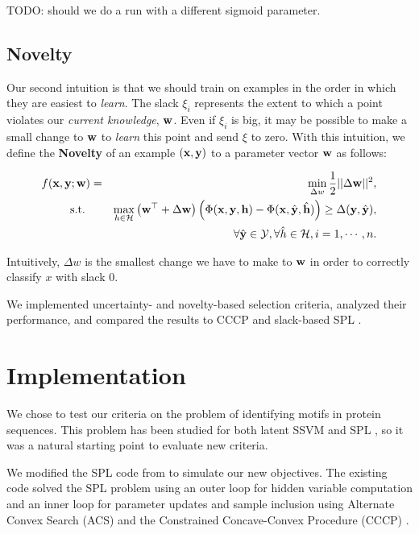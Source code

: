 \documentclass{article}
\newcommand{\mysection}[1]{\vspace{-4mm}\section{#1}\vspace{-4mm}}
\begin{document}
TODO: should we do a run with a different sigmoid parameter.

\subsection{Novelty}
Our second intuition is that we should train on examples in the order in which they are easiest to \emph{learn}.  The slack $\xi_i$ represents the extent to which a point violates our \emph{current knowledge}, $\bf w$.  Even if $\xi_i$ is big, it may be possible to make a small change to $\bf w$ to \emph{learn} this point and send $\xi$ to zero.  With this intuition, we define the \textbf{Novelty} of an example $(\bf x, \bf y)$ to a parameter vector $\bf w$ as follows:

\begin{eqnarray}
f(\bf x, \bf y; \bf w) &=&\min_{\Delta w} \frac{1}{2}||{\Delta\bf w}||^2, \nonumber \\
\mbox{s.t. } && \max_{h \in {\cal H}} \left( {\bf w}^\top + \Delta\bf w \right) \left(\Phi({\bf x},{\bf y},{\bf h}) - 
		\Phi({\bf x},\hat{\bf y},\hat{\bf h}) \right)
	 \geq \Delta({\bf y},\hat{\bf y}) , \nonumber \\
\label{eq:novelty}
&&\forall \hat{\bf y} \in {\cal Y}, \forall \hat{h} \in {\cal H}, i=1,\cdots,n.
\end{eqnarray}

Intuitively, $\Delta w$ is the smallest change we have to make to $\bf w$ in order to correctly classify $x$ with slack 0.  

We implemented uncertainty- and novelty-based selection criteria, analyzed their performance, and compared the results to CCCP \cite{SSVM} and slack-based SPL \cite{SPL}.

\mysection{Implementation}
\label{sec:Implementation}
We chose to test our criteria on the problem of identifying motifs in protein sequences.  This problem has been studied for both latent SSVM \cite{SSVM} and SPL \cite{SPL}, so it was a natural starting point to evaluate new criteria.

We modified the SPL code from \cite{SPL} to simulate our new objectives. The existing code solved the SPL problem using an outer loop for hidden variable computation and an inner loop for parameter updates and sample inclusion using Alternate Convex Search ({\sc ACS}) \cite{SPL} and the Constrained Concave-Convex Procedure ({\sc CCCP}) \cite{SSVM}.
\end{document}
